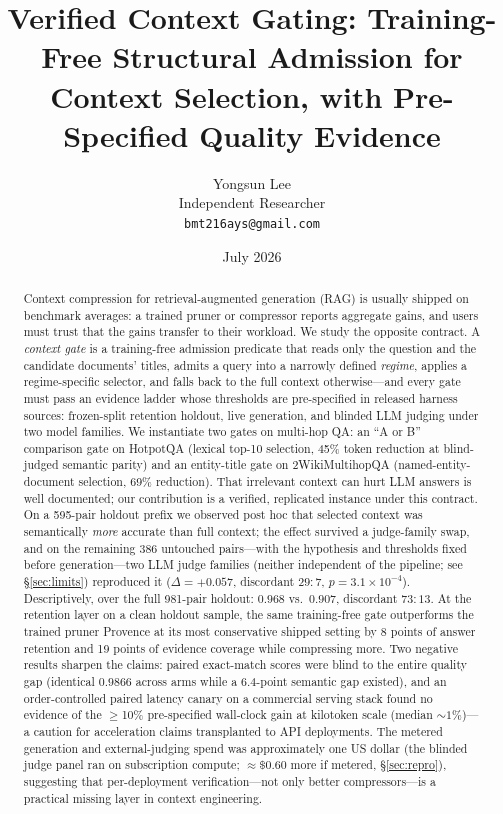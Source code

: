 \documentclass[11pt]{article}
\title{Verified Context Gating: Training-Free Structural Admission for
Context Selection, with Pre-Specified Quality Evidence}
\author{Yongsun Lee\\ Independent Researcher\\ \texttt{bmt216ays@gmail.com}}
\date{July 2026}
\begin{document}
\maketitle

\begin{abstract}
Context compression for retrieval-augmented generation (RAG) is usually
shipped on benchmark averages: a trained pruner or compressor reports
aggregate gains, and users must trust that the gains transfer to their
workload. We study the opposite contract. A \emph{context gate} is a
training-free admission predicate that reads only the question and the
candidate documents' titles, admits a query into a narrowly defined
\emph{regime}, applies a regime-specific selector, and falls back to the
full context otherwise---and every gate must pass an evidence ladder whose
thresholds are pre-specified in released harness sources: frozen-split
retention holdout, live generation, and blinded LLM judging under two
model families. We instantiate two gates on multi-hop QA: an ``A or B''
comparison gate on HotpotQA (lexical top-10 selection, 45\% token
reduction at blind-judged semantic parity) and an entity-title gate on
2WikiMultihopQA (named-entity-document selection, 69\% reduction). That
irrelevant context can hurt LLM answers is well documented; our
contribution is a verified, replicated instance under this contract. On a
595-pair holdout prefix we observed post hoc that selected context was
semantically \emph{more} accurate than full context; the effect survived a
judge-family swap, and on the remaining 386 untouched pairs---with the
hypothesis and thresholds fixed before generation---two LLM judge families
(neither independent of the pipeline; see \S\ref{sec:limits}) reproduced it
($\Delta=+0.057$, discordant $29{:}7$, $p=3.1\times10^{-4}$).
Descriptively, over the full 981-pair holdout:
$0.968$ vs.\ $0.907$, discordant $73{:}13$. At the retention layer on a
clean holdout sample, the same training-free gate outperforms the trained
pruner Provence at its most conservative shipped setting by 8 points of
answer retention and 19 points of evidence coverage while compressing
more. Two negative results sharpen the claims: paired exact-match scores
were blind to the entire quality gap (identical $0.9866$ across arms while
a 6.4-point semantic gap existed), and an order-controlled paired latency
canary on a commercial serving stack found no evidence of the
$\ge$10\% pre-specified wall-clock gain at kilotoken scale (median
${\sim}1\%$)---a caution for acceleration claims transplanted to API
deployments. The metered generation and external-judging spend was
approximately one US dollar (the blinded judge panel ran on subscription
compute; ${\approx}\$0.60$ more if metered, \S\ref{sec:repro}), suggesting
that per-deployment verification---not only better compressors---is a
practical missing layer in context engineering.
\end{abstract}
\end{document}
